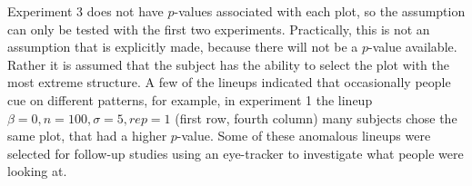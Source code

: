 \documentclass{article}
\begin{document}
Experiment 3 does not have $p$-values associated with each plot, so the assumption can only be tested with the first two experiments. Practically, this is not an assumption that is explicitly made, because there will not be a $p$-value available. Rather it is assumed that the subject has the ability to select the plot with the most extreme structure. A few of the lineups indicated that occasionally people cue on different patterns, for example, in experiment 1 the lineup $\beta=0, n=100, \sigma=5, rep=1$ (first row, fourth column) many subjects chose the same plot, that had a higher $p$-value. Some of these anomalous lineups were selected for follow-up studies using an eye-tracker to investigate what people were looking at.


\end{document}
